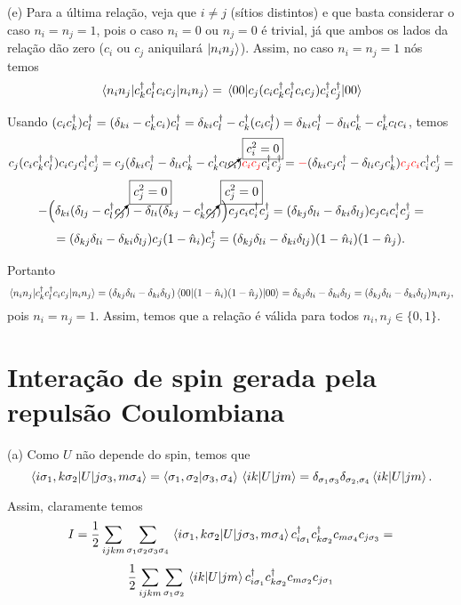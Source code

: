 \documentclass[a4paper,10pt]{article}
\begin{document}
(e) Para a última relação, veja que $i \neq j$ (sítios distintos) e que basta considerar o caso $n_i = n_j = 1$, pois o caso $n_i = 0$ ou $n_j = 0$ é trivial, já que ambos os lados da relação dão zero ($c_i$ ou $c_j$ aniquilará $\ket{n_i n_j}$). Assim, no caso $n_i = n_j = 1$ nós temos
$$
\ev{c_k^\d c_l^\d c_i c_j}{n_i n_j} = \ev{c_j (c_i c_k^\d c_l^\d c_i c_j) c_i^\d c_j^\d}{00}
$$

Usando $(c_i c_k^\dagger) c_l^\dagger = (\delta_{ki} - c_k^\dagger c_i) c_l^\dagger = \delta_{ki} c_l^\dagger - c_k^\dagger (c_i c_l^\dagger) = \delta_{ki} c_l^\dagger - \delta_{li} c_k^\dagger - c_k^\dagger c_l c_i$, temos
$$
c_j (c_i c_k^\dagger c_l^\dagger) c_i c_j c_i^\dagger c_j^\dagger =
c_j (\delta_{ki} c_l^\dagger - \delta_{li} c_k^\dagger - c_k^\dagger c_l \cancelto{\boxed{c_i^2 = 0}}{c_i}) \textcolor{red}{c_i c_j} c_i^\dagger c_j^\dagger =
\textcolor{red}{-} (\delta_{ki} c_j c_l^\dagger - \delta_{li} c_j c_k^\dagger ) \textcolor{red}{c_j c_i} c_i^\dagger c_j^\dagger =
$$
$$
- \Big(\delta_{ki} (\delta_{lj} - c_l^\dagger \cancelto{\boxed{c_j^2 = 0}}{c_j}) - \delta_{li} (\delta_{kj} - c_k^\dagger \cancelto{\boxed{c_j^2 = 0}}{c_j}) \Big)
c_j c_i c_i^\dagger c_j^\dagger =
(\delta_{kj} \delta_{li} - \delta_{ki} \delta_{lj} ) c_j c_i c_i^\dagger c_j^\dagger =
$$
$$
= (\delta_{kj} \delta_{li} - \delta_{ki} \delta_{lj} ) c_j (1 - \hat{n}_i) c_j^\dagger =
(\delta_{kj} \delta_{li} - \delta_{ki} \delta_{lj} ) (1 - \hat{n}_i) (1 - \hat{n}_j).
$$

Portanto
$$
\ev{c_k^\d c_l^\d c_i c_j}{n_i n_j} = (\delta_{kj} \delta_{li} - \delta_{ki} \delta_{lj} ) \ev{(1 - \nn_i) (1 - \nn_j)}{00}
= \delta_{kj} \delta_{li} - \delta_{ki} \delta_{lj} = (\delta_{kj} \delta_{li} - \delta_{ki} \delta_{lj}) n_i n_j,
$$
pois $n_i = n_j = 1$. Assim, temos que a relação é válida para todos $n_i, n_j \in \{0, 1\}$.




\pagebreak



\section{Interação de spin gerada pela repulsão Coulombiana}

(a) Como $U$ não depende do spin, temos que
$$
\mel{i\sigma_1, k \sigma_2}{U}{j \sigma_3, m \sigma_4} =
\braket{\sigma_1, \sigma_2}{\sigma_3, \sigma_4} \mel{ik}{U}{jm} =
\delta_{\sigma_1 \sigma_3} \delta_{\sigma_2, \sigma_4} \mel{ik}{U}{jm}.
$$

Assim, claramente temos
$$
I = \frac{1}{2} \sum_{ijkm} \sum_{\sigma_1\sigma_2\sigma_3\sigma_4}
\mel{i\sigma_1, k \sigma_2}{U}{j \sigma_3, m \sigma_4} c_{i\sigma_1}^\dagger c_{k\sigma_2}^\dagger c_{m\sigma_4} c_{j\sigma_3}=
$$
$$
\frac{1}{2} \sum_{ijkm} \sum_{\sigma_1\sigma_2}
\mel{ik}{U}{jm} c_{i\sigma_1}^\dagger c_{k\sigma_2}^\dagger c_{m\sigma_2} c_{j\sigma_1}
$$
\end{document}
